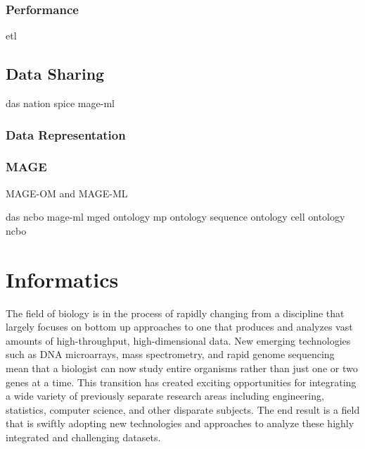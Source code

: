 \subsubsection{Performance}
etl			\cite{kimball2004}
\subsection{Data Sharing}

das			\cite{PMID_11667947}
nation			\cite{nation}
spice			\cite{PMID_16204122}
mage-ml			\cite{PMID_12225585}

\subsubsection{Data Representation}
\subsubsection{MAGE}
\label{MAGE}
MAGE-OM and MAGE-ML

das			\cite{PMID_11667947}
ncbo			\cite{PMID_16901225}
mage-ml			\cite{PMID_12225585}
mged ontology		\cite{PMID_16428806}
mp ontology		\cite{PMID_15642099}
sequence ontology	\cite{PMID_15892872}
cell ontology		\cite{PMID_15693950}
ncbo			\cite{PMID_16901225}

\section{Informatics}
The field of biology is in the process of rapidly changing from a discipline
that largely focuses on bottom up approaches to one that produces and analyzes
vast amounts of high-throughput, high-dimensional data. New emerging
technologies such as DNA microarrays, mass spectrometry, and rapid genome
sequencing mean that a biologist can now study entire organisms rather than just
one or two genes at a time.  This transition has created exciting opportunities
for integrating a wide variety of previously separate research areas including
engineering, statistics, computer science, and other disparate subjects.  The
end result is a field that is swiftly adopting new technologies and approaches
to analyze these highly integrated and challenging datasets. 

